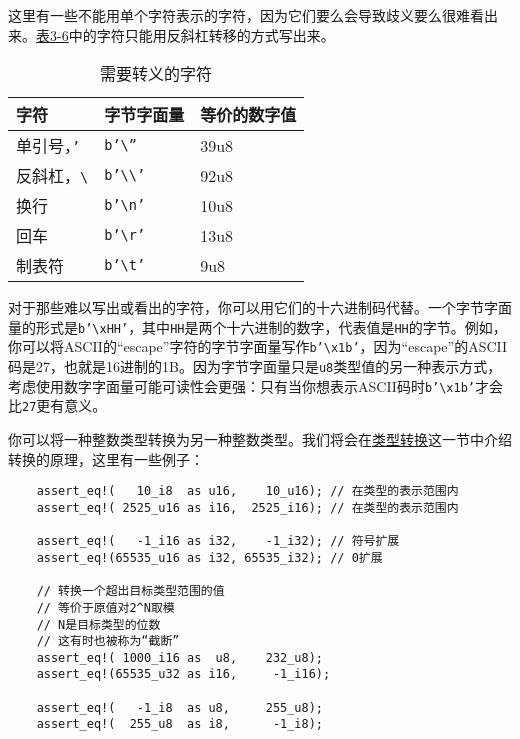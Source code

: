 这里有一些不能用单个字符表示的字符，因为它们要么会导致歧义要么很难看出来。\hyperref[t3-6]{表3-6}中的字符只能用反斜杠转移的方式写出来。
\begin{table}[htbp]
    \centering
    \caption{需要转义的字符}
    \label{t3-6}
    \begin{tabular}{lll}
        \hline
        \textbf{字符}   &   \textbf{字节字面量} & \textbf{等价的数字值} \\
        \hline
        单引号，\texttt{'}   &   \texttt{b'\textbackslash''}      & 39u8 \\
        \rowcolor{tablecolor}
        反斜杠，\texttt{\textbackslash} &    \texttt{b'\textbackslash\textbackslash'} & 92u8 \\
        换行        &    \texttt{b'\textbackslash n'}    & 10u8 \\
        \rowcolor{tablecolor}
        回车        &   \texttt{b'\textbackslash r'}     & 13u8 \\
        制表符      &   \texttt{b'\textbackslash t'}     & 9u8 \\
    \end{tabular}
\end{table}

对于那些难以写出或看出的字符，你可以用它们的十六进制码代替。一个字节字面量的形式是\texttt{b'\textbackslash xHH'}，其中\texttt{HH}是两个十六进制的数字，代表值是\texttt{HH}的字节。例如，你可以将ASCII的“escape”字符的字节字面量写作\texttt{b'\textbackslash x1b'}，因为“escape”的ASCII码是27，也就是16进制的1B。因为字节字面量只是\texttt{u8}类型值的另一种表示方式，考虑使用数字字面量可能可读性会更强：只有当你想表示ASCII码时\texttt{b'\textbackslash x1b'}才会比\texttt{27}更有意义。

你可以将一种整数类型转换为另一种整数类型。我们将会在\hyperref[cast]{类型转换}这一节中介绍转换的原理，这里有一些例子：
\begin{verbatim}
    assert_eq!(   10_i8  as u16,    10_u16); // 在类型的表示范围内
    assert_eq!( 2525_u16 as i16,  2525_i16); // 在类型的表示范围内

    assert_eq!(   -1_i16 as i32,    -1_i32); // 符号扩展
    assert_eq!(65535_u16 as i32, 65535_i32); // 0扩展

    // 转换一个超出目标类型范围的值
    // 等价于原值对2^N取模
    // N是目标类型的位数
    // 这有时也被称为“截断”
    assert_eq!( 1000_i16 as  u8,    232_u8);
    assert_eq!(65535_u32 as i16,     -1_i16);

    assert_eq!(   -1_i8  as u8,     255_u8);
    assert_eq!(  255_u8  as i8,      -1_i8);
\end{verbatim}

